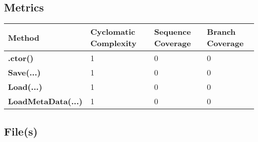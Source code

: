 \documentclass[a4paper,10pt]{article}
\begin{document}
\subsection{Metrics}
\begin{longtable}[l]{|l|l|l|l|}
\hline
\textbf{Method} & \textbf{Cyclomatic Complexity} & \textbf{Sequence Coverage} & \textbf{Branch Coverage}\\
\hline
\textbf{.ctor()} & 1 & 0 & 0\\
\hline
\textbf{Save(...)} & 1 & 0 & 0\\
\hline
\textbf{Load(...)} & 1 & 0 & 0\\
\hline
\textbf{LoadMetaData(...)} & 1 & 0 & 0\\
\hline
\end{longtable}
\subsection{File(s)}
\end{document}
